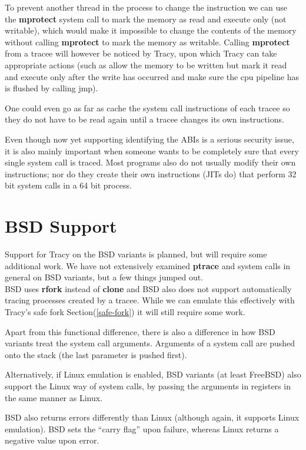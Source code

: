 \documentclass[a4paper, 10pt]{report}
\begin{document}
To prevent another thread in the process to change the instruction we can
use the \textbf{mprotect} system call to mark the memory as read and execute
only (not writable), which would make it impossible to change the contents of
the memory without calling \textbf{mprotect} to mark the memory as writable.
Calling \textbf{mprotect} from a tracee will however be noticed by Tracy,
upon which Tracy can take appropriate actions (such as allow the memory to be
written but mark it read and execute only after the write has occurred and make
sure the cpu pipeline has is flushed by calling jmp).

One could even go as far as cache the system call instructions of each tracee
so they do not have to be read again until a tracee changes its own
instructions.

Even though now yet supporting identifying the ABIs is a serious security issue,
it is also mainly important when someone wants to be completely sure that every
single system call is traced. Most programs also do not usually modify their
own instructions; nor do they create their own instructions (JITs do)
that perform 32 bit system calls in a 64 bit process.

\section{BSD Support}

Support for Tracy on the BSD variants is planned, but will require some
additional work. We have not extensively examined \textbf{ptrace} and
system calls in general on BSD variants, but a few things jumped out. \\

BSD uses \textbf{rfork} instead of \textbf{clone} and BSD also does
not support automatically tracing processes created by a tracee. While
we can emulate this effectively with Tracy's safe fork
Section(\ref{safe-fork}) it will still require some work.

Apart from this functional difference, there is also a difference in
how BSD variants treat the system call arguments. Arguments of a system
call are pushed onto the stack (the last parameter is pushed first).
\cite{int80h}

Alternatively, if Linux emulation is enabled, BSD variants (at least FreeBSD)
also support the Linux way of system calls, by passing the arguments in
registers in the same manner as Linux.

BSD also returns errors differently than Linux (although again, it supports
Linux emulation). BSD sets the ``carry flag'' upon failure, whereas Linux
returns a negative value upon error.
\end{document}
